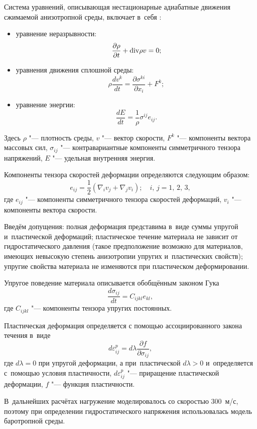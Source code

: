Система уравнений, описывающая нестационарные адиабатные движения сжимаемой анизотропной среды, включает в~себя \cite{tuch:bib1}:
\begin{itemize}
\item уравнение неразрывности:
\[
\frac{\partial \rho }{\partial t} + {\rm div}\rho  v  = 0;
\]
\item уравнения движения сплошной среды:
\[
\rho \frac{dv ^k}{dt} = \frac{\partial \sigma ^{ki}}{\partial x_i} + F^k;
\]

\item уравнение энергии:
\[
\frac{dE}{dt} = \frac{1}{\rho }\sigma ^{ij}e_{ij}.
\]
\end{itemize}
Здесь $\rho $ "--- плотность среды, $ v  $ "--- вектор скорости, $F^k$ "--- компоненты вектора массовых сил,
$\sigma _{ij} $ "--- контравариантные компоненты симметричного тензора напряжений, $E$ "--- удельная внутренняя энергия.



Компоненты тензора скоростей деформации определяются следующим образом:
\[
e_{ij} = \frac{1}{2}(\nabla_i v  _j + \nabla _j v  _i); \quad i,\,j = 1,\,2,\,3,
\]
где $e_{ij}$ "--- компоненты симметричного тензора скоростей деформаций, $v  _i $ "--- компоненты вектора скорости.

Введём допущения: полная деформация представима в~виде суммы упругой и~пластической деформаций; 
пластическое течение материала не зависит от гидростатического давления (такое предположение возможно для материалов, имеющих невысокую степень анизотропии упругих и~пластических свойств); 
упругие свойства материала не изменяются при пластическом деформировании.

Упругое поведение материала описывается обобщённым законом Гука
\[
\frac{d \sigma _{ij} }{dt} = C_{ijkl} e_{kl}, 
\]
где $C_{ijkl}$ "--- компоненты тензора упругих постоянных.

Пластическая деформация определяется с помощью ассоциированного закона течения в~виде
\[
d\varepsilon _{ij}^p = d\lambda \frac{\partial f}{\partial \sigma _{ij}},
\]
где $d\lambda = 0$ при упругой деформации, а при~пластической $d \lambda >0$ и~определяется с~помощью условия пластичности, 
$d \varepsilon^p_{ij}$ "--- приращение пластической деформации, 
$f$ "--- функция пластичности.

В~дальнейших расчётах нагружение моделировалось со скоростью 300~м/с, поэтому при определении гидростатического напряжения использовалась модель баротропной среды.

